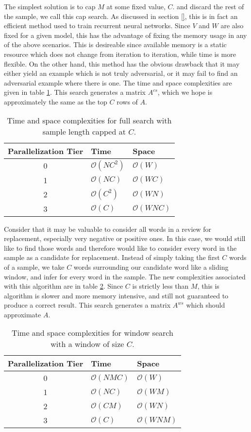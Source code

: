 The simplest solution is to cap $M$ at some fixed value, $C$. and discard the rest of the sample, we call this cap search.  As discussed in section \ref{}, this is in fact an efficient method used to train recurrent neural networks.  Since $V$ and $W$ are also fixed for a given model, this has the advantage of fixing the memory usage in any of the above scenarios.  This is desireable since available memory is a static resource which does not change from iteration to iteration, while time is more flexible.  On the other hand, this method has the obvious drawback that it may either yield an example which is not truly adversarial, or it may fail to find an adversarial example where there is one.  The time and space complexities are given in table \ref{tab:wa_complexity}.  This search generates a matrix $A^{cs}$, which we hope is approximately the same as the top $C$ rows of $A$.
\begin{table}
\centering
\begin{tabular}{ |c|l|l| } 
 \hline
 Parallelization Tier & Time & Space \\ \hline
 0&$\mathcal{O}(NC^2)$ & $\mathcal{O}(W)$ \\ %
 1&$\mathcal{O}(NC)$ & $\mathcal{O}(WC)$ \\ %
 2&$\mathcal{O}(C^2)$ & $\mathcal{O}(WN)$ \\%
 3&$\mathcal{O}(C)$ & $\mathcal{O}(WNC)$ \\ \hline
\end{tabular}
\caption{Time and space complexities for full search with sample length capped at $C$.}
\label{tab:wa_complexity}
\end{table}

Consider that it may be valuable to consider all words in a review for replacement, especially very negative or positive ones.  In this case, we would still like to find those words and therefore would like to consider every word in the sample as a candidate for replacement.  Instead of simply taking the first $C$ words of a sample, we take $C$ words surrounding our candidate word like a sliding window, and infer for every word in the sample.  The new complexities associated with this algorithm are in table \ref{tab:waw_complexity}.  Since $C$ is strictly less than $M$, this is algorithm is slower and more memory intensive, and still not guaranteed to produce a correct result.  This search generates a matrix $A^{ws}$ which should approximate $A$.
\begin{table}
\centering
\begin{tabular}{ |c|l|l| } 
 \hline
 Parallelization Tier & Time & Space \\ \hline
 0&$\mathcal{O}(NMC)$ & $\mathcal{O}(W)$ \\
 1&$\mathcal{O}(NC)$ & $\mathcal{O}(WM)$ \\
 2&$\mathcal{O}(CM)$ & $\mathcal{O}(WN)$ \\
 3&$\mathcal{O}(C)$ & $\mathcal{O}(WNM)$ \\ \hline
\end{tabular}
\caption{Time and space complexities for window search with a window of size $C$.}
\label{tab:waw_complexity}
\end{table}
